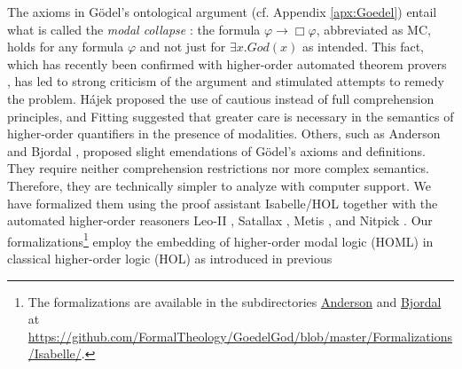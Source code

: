 \documentclass{birkjour}
\theoremstyle{definition}
\theoremstyle{remark}
\numberwithin{equation}{section}
\begin{document}
\maketitle

\vspace*{-5em}

The axioms in G\"odel's ontological argument 
\cite{GoedelNotes,ScottNotes} (cf. Appendix \ref{apx:Goedel}) entail what is called the \emph{modal collapse}
\cite{Sobel1987,SobelBook2004}: the formula $\varphi \rightarrow \Box
\varphi$, abbreviated as MC, holds for any formula $\varphi$ and not
just for $\exists x. \mathit{God}(x)$ as intended. This fact, which has
recently been confirmed with higher-order automated theorem provers
\cite{C40,J30}, has led to strong criticism of the argument and stimulated attempts to remedy the problem. Hájek
\cite{Hajek_der_Mathematiker_2002,Hajek_Magari_and_others_1996} proposed the use
of cautious instead of full comprehension principles, and Fitting \cite{fitting02:_types_tableaus_god} suggested that greater care is necessary in the semantics of higher-order quantifiers in the presence of modalities. Others, such as
Anderson
\cite{anderson90:_some_emend_of_goedel_ontol_proof,AndersonGettings}
and Bjordal \cite{bjordal99}, proposed slight emendations of
G\"odel's axioms and definitions. They require neither comprehension restrictions nor more complex semantics. Therefore, they are technically simpler to analyze with computer support. We have formalized them using the proof
assistant Isabelle/HOL \cite{Isabelle} together with the automated higher-order
reasoners Leo-II \cite{C26}, Satallax \cite{brown2012satallax}, Metis
\cite{Hurd03first-orderproof}, and Nitpick \cite{Nitpick}.  
Our formalizations\footnote{The
  formalizations are available in the subdirectories \url{Anderson}
  and \url{Bjordal} at
  \url{https://github.com/FormalTheology/GoedelGod/blob/master/Formalizations/Isabelle/}.}
employ the embedding of higher-order modal logic (HOML) in classical
higher-order logic (HOL) as introduced in previous
\end{document}
